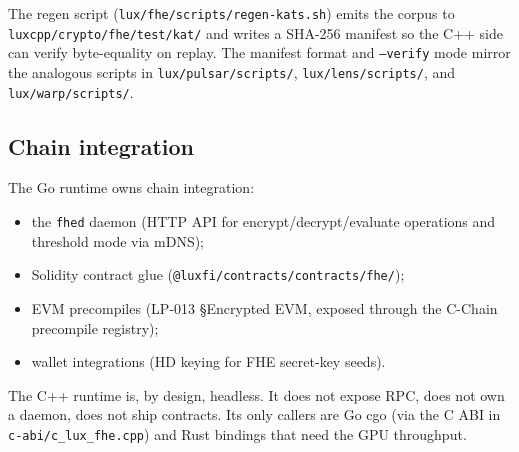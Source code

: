 The regen script (\texttt{lux/fhe/scripts/regen-kats.sh}) emits the
corpus to \texttt{luxcpp/crypto/fhe/test/kat/} and writes a SHA-256
manifest so the C++ side can verify byte-equality on replay. The
manifest format and \texttt{--verify} mode mirror the analogous scripts
in \texttt{lux/pulsar/scripts/}, \texttt{lux/lens/scripts/}, and
\texttt{lux/warp/scripts/}.

\subsection{Chain integration}

The Go runtime owns chain integration:

\begin{itemize}
\item the \texttt{fhed} daemon (HTTP API for encrypt/decrypt/evaluate
operations and threshold mode via mDNS);
\item Solidity contract glue (\texttt{@luxfi/contracts/contracts/fhe/});
\item EVM precompiles (LP-013 \S Encrypted EVM, exposed through the
C-Chain precompile registry);
\item wallet integrations (HD keying for FHE secret-key seeds).
\end{itemize}

The C++ runtime is, by design, headless. It does not expose RPC, does
not own a daemon, does not ship contracts. Its only callers are Go cgo
(via the C ABI in \texttt{c-abi/c\_lux\_fhe.cpp}) and Rust bindings
that need the GPU throughput.

